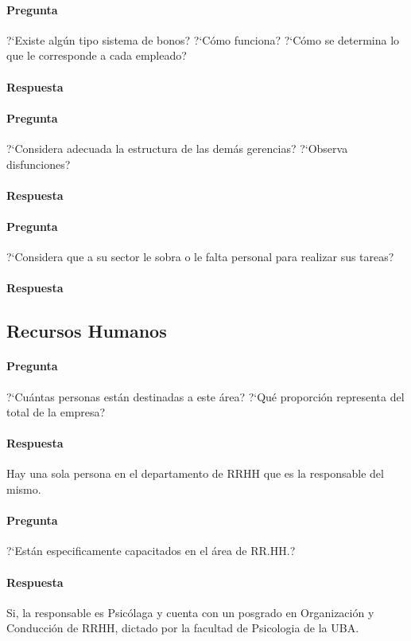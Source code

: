 \documentclass[12pt,a4paper,spanish]{article}
\begin{document}
	\paragraph{Pregunta}
	 ?`Existe alg\'un tipo sistema de bonos?  ?`C\'omo funciona?  ?`C\'omo se determina lo que le corresponde a cada empleado?
	\paragraph{Respuesta}

	\paragraph{Pregunta}
	 ?`Considera adecuada la estructura de las dem\'as gerencias?  ?`Observa disfunciones?
	\paragraph{Respuesta}

	\paragraph{Pregunta}
	 ?`Considera que a su sector le sobra o le falta personal para realizar sus tareas?
	\paragraph{Respuesta}

\subsection{Recursos Humanos}
	\paragraph{Pregunta}
	 ?`Cu\'antas personas est\'an destinadas a este \'area?  ?`Qu\'e proporci\'on representa del total de la empresa?
	\paragraph{Respuesta}
	Hay una sola persona en el departamento de RRHH que es la responsable del mismo.

	\paragraph{Pregunta}
	 ?`Est\'an especificamente capacitados en el \'area de RR.HH.?
	\paragraph{Respuesta}
	Si, la responsable es Psic\'olaga y cuenta con un posgrado en Organizaci\'on y Conducci\'on de RRHH, dictado por la facultad de Psicologia de la UBA.
\end{document}
